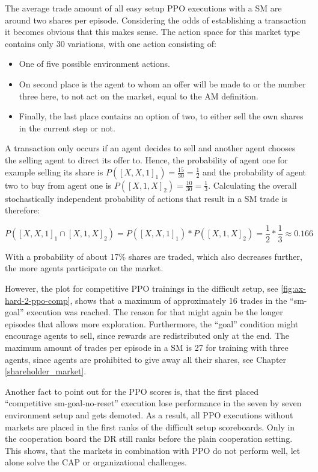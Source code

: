 The average trade amount of all easy setup PPO executions with a SM  are around two shares per episode. Considering the odds of establishing a transaction it becomes obvious that this makes sense. The action space for this market type contains only 30 variations, with one action consisting of:
\begin{itemize}
    \item One of five possible environment actions.
    \item On second place is the agent to whom an offer will be made to or the number three here, to not act on the market, equal to the AM definition.
    \item Finally, the last place contains an option of two, to either sell the own shares in the current step or not.
\end{itemize}
A transaction only occurs if an agent decides to sell and another agent chooses the selling agent to direct its offer to. Hence, the probability of agent one for example selling its share is $P([X,X,1]_{1})=\frac{15}{30}=\frac{1}{2}$ and the probability of agent two to buy from agent one is $P([X,1,X]_{2})=\frac{10}{30}=\frac{1}{3}$. Calculating the overall stochastically independent probability of actions that result in a SM trade is therefore: 

\begin{equation}\label{eq:TRPO}
    P([X,X,1]_{1} \cap [X,1,X]_{2})=P([X,X,1]_{1}) * P([X,1,X]_{2}) = \frac{1}{2}*\frac{1}{3} \approx 0.166
\end{equation}

With a probability of about 17\% shares are traded, which also decreases further, the more agents participate on the market.

However, the plot for competitive PPO trainings in the difficult setup, see \ref{fig:ax-hard-2-ppo-comp}, shows that a maximum of approximately 16 trades in the ``sm-goal'' execution was reached. The reason for that might again be the longer episodes that allows more exploration. Furthermore, the ``goal'' condition might encourage agents to sell, since rewards are redistributed only at the end. The maximum amount of trades per episode in a SM is 27 for training with three agents, since agents are prohibited to give away all their shares, see Chapter \ref{shareholder_market}.

Another fact to point out for the PPO scores is, that the first placed ``competitive sm-goal-no-reset'' execution lose performance in the seven by seven environment setup and gets demoted. As a result, all PPO executions without markets are placed in the first ranks of the difficult setup scoreboards. Only in the cooperation board the DR still ranks before the plain cooperation setting. This shows, that the markets in combination with PPO do not perform well, let alone solve the CAP or organizational challenges.

